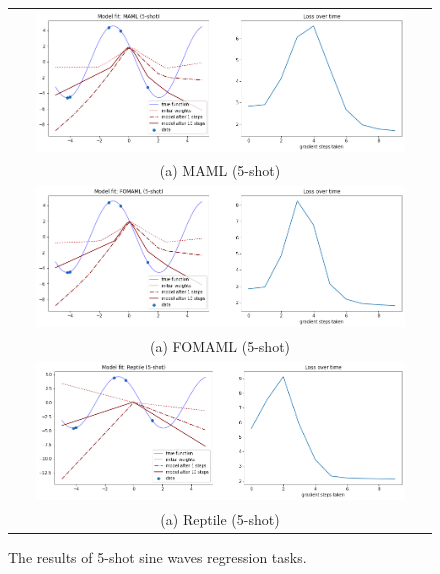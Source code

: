 \documentclass[final]{cvpr}
\begin{document}
\begin{figure}[b]
    \centering
	\begin{tabular}{c}
		\includegraphics[width=0.9\textwidth]{resources/maml_5.png}\\
		(a) MAML (5-shot) \\
		\includegraphics[width=0.9\textwidth]{resources/fomaml_5.png}\\
		(a) FOMAML (5-shot) \\
		\includegraphics[width=0.9\textwidth]{resources/reptile_5.png}\\
		(a) Reptile (5-shot) \\
	\end{tabular}\vspace{0.2cm}
	\caption{The results of 5-shot sine waves regression tasks.}
	\label{sin5}
\end{figure}
\end{document}
